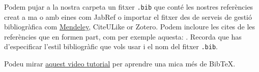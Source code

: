 \documentclass[a4paper]{article}
\begin{document}
Podem pujar a la nostra carpeta un fitxer \verb|.bib| que conté les nostres referències creat a ma o amb eines com JabRef o importar el fitxer des de serveis de gestió bibliogràfica com \href{https://www.overleaf.com/blog/184}{Mendeley}, CiteULike or Zotero. Podem incloure les cites de les referències que en formen part, com per exemple aquesta: \cite{greenwade93}. Recorda que has d'especificar l'estil bibliogràfic que vols usar i el nom del fitxer \verb|.bib|.

Podeu mirar \href{https://www.overleaf.com/help/97-how-to-include-a-bibliography-using-bibtex}{aquest video tutorial} per aprendre una mica més de BibTeX.



\end{document}
